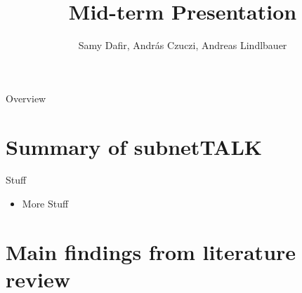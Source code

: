 \documentclass[10pt]{beamer}
\title{Mid-term Presentation}
\author{Samy Dafir, András Czuczi, Andreas Lindlbauer} %
\date{}
\begin{document}
\begin{frame}
	\maketitle 
\end{frame}


\begin{frame}{Overview}
	\tableofcontents
\end{frame}


\section{Summary of subnetTALK}


\begin{frame}{Stuff}
	\begin{itemize}
        \pause{}
		\item More Stuff
	\end{itemize}	
\end{frame}


\section{Main findings from literature review}

\end{document}
